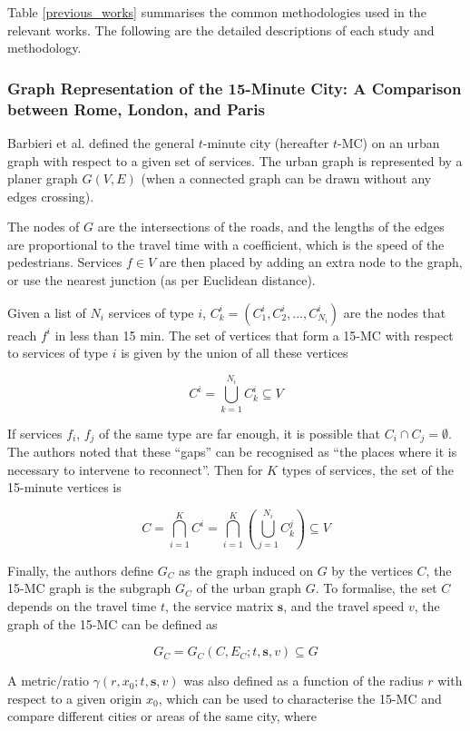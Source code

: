 Table \ref{previous_works} summarises the common methodologies used in the relevant works. The following are the detailed descriptions of each study and methodology.

\subsubsection{Graph Representation of the 15-Minute City: A Comparison between Rome, London, and Paris \texorpdfstring{\cite{barbieri_graph_2023}}{}} \label{barbieri_graph_2023}

Barbieri et al. defined the general $t$-minute city (hereafter $t$-MC) on an urban graph with respect to a given set of services. The urban graph is represented by a planer graph $G(V,E)$ (when a connected graph can be drawn without any edges crossing).

The nodes of $G$ are the intersections of the roads, and the lengths of the edges are proportional to the travel time with a coefficient, which is the speed of the pedestrians. Services $f\in V$ are then placed by adding an extra node to the graph, or use the nearest junction (as per Euclidean distance).

Given a list of $N_i$ services of type $i$, $C^i_k=(C^i_1,C^i_2,...,C^i_{N_i})$ are the nodes that reach $f^i$ in less than 15 min. The set of vertices that form a 15-MC with respect to services of type $i$ is given by the union of all these vertices

$$ C^i=\bigcup_{k=1}^{N_i}C^i_k\subseteq V $$

If services $f_i$, $f_j$ of the same type are far enough, it is possible that $C_i\cap C_j=\emptyset$. The authors noted that these “gaps” can be recognised as “the places where it is necessary to intervene to reconnect”. Then for $K$ types of services, the set of the 15-minute vertices is

$$C=\bigcap^K_{i=1}C^i=\bigcap^K_{i=1}\left(\bigcup^{N_i}_{j=1}C^j_k\right)\subseteq V$$

Finally, the authors define $G_C$ as the graph induced on $G$ by the vertices $C$, the 15-MC graph is the subgraph $G_C$ of the urban graph $G$. To formalise, the set $C$ depends on the travel time $t$, the service matrix $\mathbf s$, and the travel speed $v$, the graph of the 15-MC can be defined as

$$ G_C=G_C(C,E_C;t,\mathbf s,v)\subseteq G $$

A metric/ratio $\gamma(r,x_0;t,\mathbf s,v)$ was also defined as a function of the radius $r$ with respect to a given origin $x_0$, which can be used to characterise the 15-MC and compare different cities or areas of the same city, where

